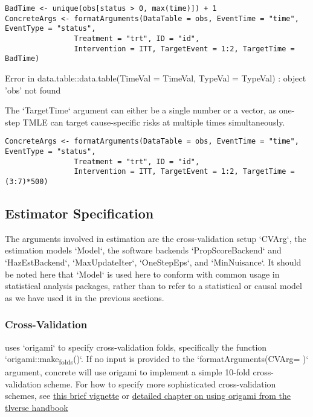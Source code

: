 \documentclass{report}
\newcommand{\1}{\ensuremath{\mathbf{1}}}
\begin{document}
\begin{lstlisting}
BadTime <- unique(obs[status > 0, max(time)]) + 1
ConcreteArgs <- formatArguments(DataTable = obs, EventTime = "time", EventType = "status", 
				Treatment = "trt", ID = "id", 
				Intervention = ITT, TargetEvent = 1:2, TargetTime = BadTime)
\end{lstlisting}

Error in data.table::data.table(TimeVal = TimeVal, TypeVal = TypeVal) : 
  object 'obs' not found

The `TargetTime` argument can either be a single number or a vector, as one-step TMLE can target cause-specific risks at multiple times simultaneously.

\begin{lstlisting}
ConcreteArgs <- formatArguments(DataTable = obs, EventTime = "time", EventType = "status", 
				Treatment = "trt", ID = "id", 
				Intervention = ITT, TargetEvent = 1:2, TargetTime = (3:7)*500)
\end{lstlisting}

\subsection{Estimator Specification}
\label{sec:orgeaf0dd8}
The arguments involved in estimation are the cross-validation setup `CVArg`, the estimation models `Model`, the software backends `PropScoreBackend` and `HazEstBackend`, `MaxUpdateIter`, `OneStepEps`, and `MinNuisance`. It should be noted here that `Model` is used here to conform with common usage in statistical analysis packages, rather than to refer to a statistical or causal model as we have used it in the previous sections. 

\subsubsection{Cross-Validation}
\label{sec:org4132494}

 uses `origami` to specify cross-validation folds, specifically the function `origami::make\textsubscript{folds}()`. If no input is provided to the `formatArguments(CVArg= )` argument, concrete will use origami to implement a simple 10-fold cross-validation scheme. For how to specify more sophisticated cross-validation schemes, see \href{https://tlverse.org/origami/articles/generalizedCV.html}{this brief vignette} or \href{https://tlverse.org/tlverse-handbook/origami.html}{detailed chapter on using origami from the tlverse handbook}
\end{document}
